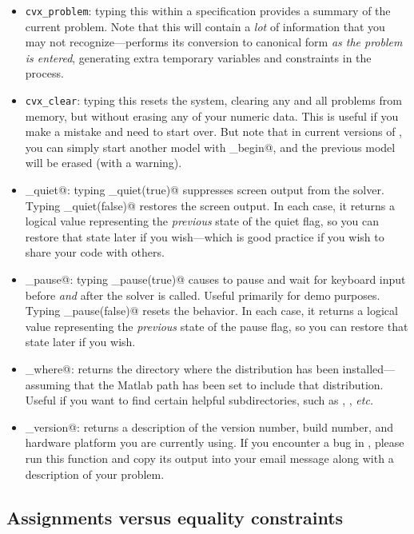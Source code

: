 \documentclass[12pt]{article}
\begin{document}
\begin{itemize}
\item \verb+cvx_problem+: typing this within a \cvx specification provides a summary
of the current problem. Note that this will contain a \emph{lot} of information
that you may not recognize---\cvx performs its conversion to canonical form
\emph{as the problem is entered}, generating extra temporary variables and
constraints in the process.
\item \verb+cvx_clear+: typing this resets the \cvx system, clearing any and all problems
from memory, but without erasing any of your numeric data.
This is useful if you make a mistake and need to start over. But note that in current
versions of \cvx, you can simply start another model with \verb@cvx_begin@, and
the previous model will be erased (with a warning).
\item \verb@cvx_quiet@: typing \verb@cvx_quiet(true)@ suppresses screen
output from the solver. Typing \verb@cvx_quiet(false)@ restores the screen
output. In each case, it returns a logical value representing the \emph{previous}
state of the quiet flag, so you can restore that state later if you wish---which
is good practice if you wish to share your code with others.
\item \verb@cvx_pause@: typing \verb@cvx_pause(true)@ causes \cvx to pause and
wait for keyboard input before \emph{and} after the solver is called. Useful
primarily for demo purposes. Typing \verb@cvx_pause(false)@ resets the behavior.
In each case, it returns a logical value representing the \emph{previous} state
of the pause flag, so you can restore that state later if you wish.
\item \verb@cvx_where@: returns the directory where the \cvx distribution
has been installed---assuming that the Matlab path has been set to include
that distribution. Useful if you want to find certain helpful subdirectories,
such as \verb@doc@, \verb@examples@, \emph{etc.}
\item \verb@cvx_version@: returns a description of the \cvx version number,
build number, and hardware platform you are currently using. If you encounter
a bug in \cvx, please run this function and copy its output into 
your email message along with a description of your problem.

\end{itemize}

\subsection{Assignments versus equality constraints}
\label{sec:eqass}
\end{document}
